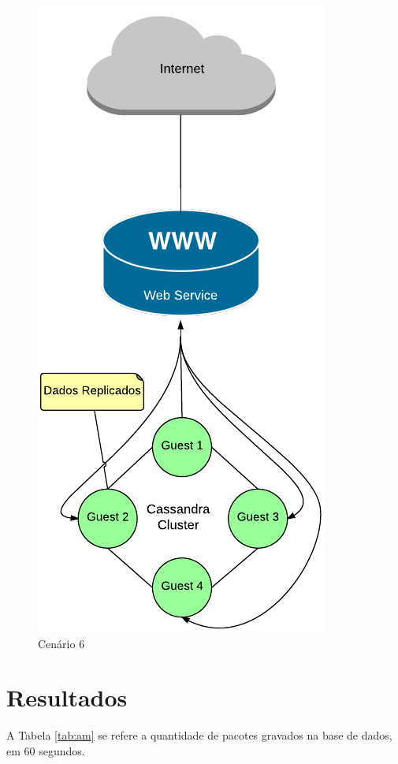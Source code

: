     \begin{figure}[H]
    \centering
    \includegraphics[scale=0.60]{imagens/BD-4Guest.pdf}
    \caption{Cenário 6}
    \label{fig:bd4guest}
    \end{figure}


\section{Resultados}

A Tabela \ref{tab:am} se refere a quantidade de pacotes gravados na base de dados, em 60 segundos.


